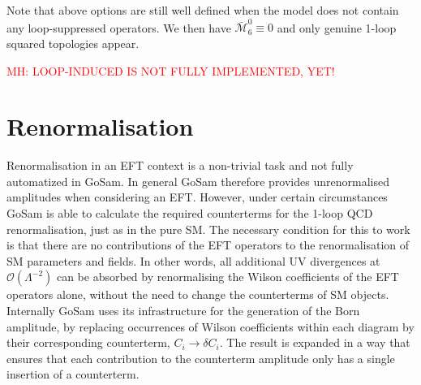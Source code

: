 \documentclass[11pt,a4paper]{refrep}
\newcommand{\gosam}{{\sc GoSam}\xspace}
\def\M{\mathcal{M}}
\begin{document}
Note that above options are still well defined when the model does not contain any loop-suppressed operators. We then have $\bar{\M}_6^0\equiv0$ and only genuine 1-loop squared topologies appear.

\textcolor{red}{MH: LOOP-INDUCED IS NOT FULLY IMPLEMENTED, YET!}


\section{Renormalisation}
Renormalisation in an EFT context is a non-trivial task and not fully automatized in \gosam. In general \gosam therefore provides unrenormalised amplitudes when considering an EFT. However, under certain circumstances \gosam is able to calculate the required counterterms for the 1-loop QCD renormalisation, just as in the pure SM. The necessary condition for this to work is that there are no contributions of the EFT operators to the renormalisation of SM parameters and fields. In other words, all additional UV divergences at $\mathcal{O}\left(\Lambda^{-2}\right)$ can be absorbed by renormalising the Wilson coefficients of the EFT operators alone, without the need to change the counterterms of SM objects. Internally GoSam uses its infrastructure for the generation of the Born amplitude, by replacing occurrences of Wilson coefficients within each diagram by their corresponding counterterm, $C_i\to \delta C_i$. The result is expanded in a way that ensures that each contribution to the counterterm amplitude only has a single insertion of a counterterm.
\end{document}
